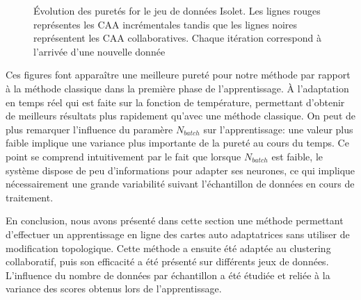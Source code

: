 \documentclass[a4paper]{article}
\begin{document}
\begin{figure}[!h]
                \caption{Évolution des puretés for le jeu de données Isolet. Les lignes rouges représentes les CAA incrémentales tandis que les lignes noires représentent les CAA collaboratives. Chaque itération correspond à l'arrivée d'une nouvelle donnée}
\label{fig:isom}
				\end{figure}


    Ces figures font apparaître une meilleure pureté pour notre méthode par rapport à la méthode classique dans la première phase de l'apprentissage. À l'adaptation en temps réel qui est faite sur la fonction de température, permettant d'obtenir de meilleurs résultats plus rapidement qu'avec une méthode classique. On peut de plus remarquer l'influence du paramère $N_{batch}$ sur l'apprentissage: une valeur plus faible implique une variance plus importante de la pureté au cours du temps. Ce point se comprend intuitivement par le fait que lorsque $N_{batch}$ est faible, le système dispose de peu d'informations pour adapter ses neurones, ce qui implique nécessairement une grande variabilité suivant l'échantillon de données en cours de traitement.

    En conclusion, nous avons présenté dans cette section une méthode permettant d'effectuer un apprentissage en ligne des cartes auto adaptatrices sans utiliser de modification topologique. Cette méthode a ensuite été adaptée au clustering collaboratif, puis son efficacité a été présenté sur différents jeux de données. L'influence du nombre de données par échantillon a été étudiée et reliée à la variance des scores obtenus lors de l'apprentissage.
\end{document}
